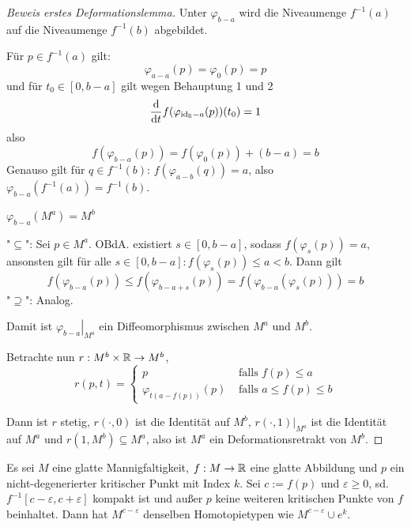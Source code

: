 \begin{proof}[Beweis erstes Deformationslemma]
     Unter $\varphi_{b-a}$ wird die Niveaumenge 
    $f^{-1}(a)$ auf die Niveaumenge $f^{-1}(b)$ abgebildet.
     
    Für $p \in f^{-1}(a)$ gilt:
    \[ \varphi_{a-a}(p) = \varphi_0(p) = p \]
    und für $t_0 \in [0, b - a]$ gilt wegen Behauptung 1 und 2
    \[ \derive{t}f(\varphi_{\id_{\R} - a}(p)) (t_0) = 1 \]
    also
    \[ f(\varphi_{b - a}(p)) = f(\varphi_{0}(p)) + (b - a) = b \]
    Genauso gilt für $q \in f^{-1}(b)$: $f(\varphi_{a - b}(q)) = a$, also 
    $\varphi_{b - a}(f^{-1}(a)) = f^{-1}(b)$.
    \sectiondone

     $\varphi_{b - a} (M^a) = M^b$

    "$\subseteq$": Sei $p \in M^a$. OBdA. existiert $s \in [0, b-a]$, sodass 
    $f(\varphi_s(p)) = a$, ansonsten gilt für alle 
    $s \in [0, b-a]: f(\varphi_s(p)) \leq a < b$. Dann gilt
    \[ f(\varphi_{b-a}(p)) \leq f(\varphi_{b-a+s}(p)) = f(\varphi_{b-a}(\varphi_s(p))) = b \] 
    "$\supseteq$": Analog.
    \sectiondone

    Damit ist $\left. \varphi_{b-a} \right\vert_{M^a}$ ein Diffeomorphismus zwischen
    $M^a$ und $M^b$. 

    Betrachte nun $r: M^b \times { \mathbb R } \to M^b$,
    \[  
        r(p, t) = \begin{cases}
            p & \text{ falls } f(p) \leq a \\
            \varphi_{t(a - f(p))}(p) & \text{ falls } a \leq f(p) \leq b 
        \end{cases}
    \]

    Dann ist $r$ stetig, $r(\cdot, 0)$ ist die Identität auf $M^b$, 
    $r(\cdot, 1)|_{M^a}$ ist die Identität auf $M^a$ und 
    $r(1, M^b) \subseteq M^a$, also ist $M^a$ ein Deformationsretrakt von $M^b$.

\end{proof}

\begin{theorem}
    \label{theorem:zweites deformationslemma}
    Es sei $M$ eine glatte Mannigfaltigkeit, $f: M \rightarrow { \mathbb R }$ eine glatte
    Abbildung und $p$ ein nicht-degenerierter kritischer Punkt mit Index 
    $k$. Sei $c := f(p)$ und $\varepsilon \geq 0$, sd. 
    $f^{-1}[c - \varepsilon, c + \varepsilon]$ kompakt ist und außer $p$ keine 
    weiteren kritischen Punkte von $f$ beinhaltet. Dann hat $M^{c-\varepsilon}$
    denselben Homotopietypen wie $M^{c - \varepsilon} \cup e^k$.
\end{theorem}

